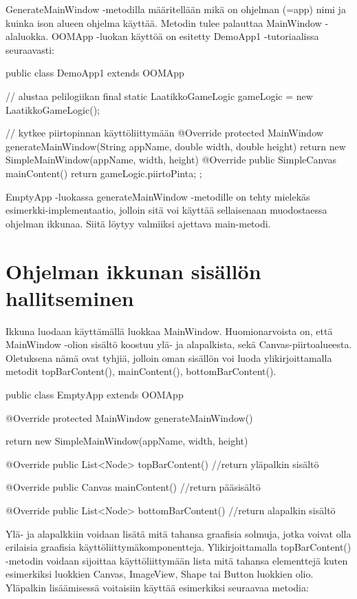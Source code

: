 GenerateMainWindow -metodilla määritellään mikä on ohjelman (=app) nimi ja
kuinka ison alueen ohjelma käyttää. Metodin tulee palauttaa MainWindow
-alaluokka. OOMApp -luokan käyttöä on esitetty DemoApp1 -tutoriaalissa
seuraavasti:

\begin{javacode}
public class DemoApp1 extends OOMApp {
    // alustaa pelilogiikan
    final static LaatikkoGameLogic gameLogic = new LaatikkoGameLogic();

    // kytkee piirtopinnan käyttöliittymään
    @Override
    protected MainWindow generateMainWindow(String appName, double width,
    double height) { return new SimpleMainWindow(appName, width, height) {
            @Override public SimpleCanvas mainContent() {
                return gameLogic.piirtoPinta;
            }
        };
    }
}
\end{javacode}

EmptyApp -luokassa generateMainWindow -metodille on tehty mielekäs
esimerkki-implementaatio, jolloin sitä voi käyttää sellaisenaan muodostaessa
ohjelman ikkunaa. Siitä löytyy valmiiksi ajettava main-metodi.

\section{Ohjelman ikkunan sisällön hallitseminen}

\label{}

Ikkuna luodaan käyttämällä luokkaa MainWindow. Huomionarvoista on, että
MainWindow -olion sisältö koostuu ylä- ja alapalkista, sekä
Canvas-piirtoalueesta. Oletuksena nämä ovat tyhjiä, jolloin oman sisällön voi
luoda ylikirjoittamalla metodit topBarContent(), mainContent(),
bottomBarContent(). 

\begin{javacode}
public class EmptyApp extends OOMApp {
	@Override
	protected MainWindow generateMainWindow(){
		return new SimpleMainWindow(appName, width, height) {
			
			@Override
			public List<Node> topBarContent() { 
				//return yläpalkin sisältö
			}
		
			@Override
			public Canvas mainContent() { 
				//return pääsisältö
			}
		
			@Override
			public List<Node> bottomBarContent() { 
				//return alapalkin sisältö
			}
		}
	}
}
\end{javacode}

Ylä- ja alapalkkiin voidaan lisätä mitä tahansa graafisia solmuja, jotka voivat
olla erilaisia graafisia käyttöliittymäkomponentteja. Ylikirjoittamalla
topBarContent() -metodin voidaan sijoittaa käyttöliittymään lista mitä tahansa
elementtejä kuten esimerkiksi luokkien Canvas, ImageView, Shape tai Button
luokkien olio. Yläpalkin lisäämisessä voitaisiin käyttää esimerkiksi seuraavaa
metodia:

